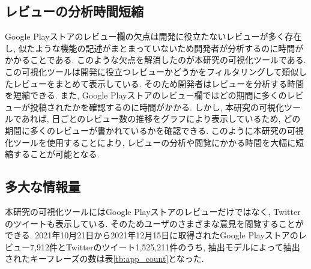 



\subsection{レビューの分析時間短縮}
Google Playストアのレビュー欄の欠点は開発に役立たないレビューが多く存在し, 似たような機能の記述がまとまっていないため開発者が分析するのに時間がかかることである. 
このような欠点を解消したのが本研究の可視化ツールである. この可視化ツールは開発に役立つレビューかどうかをフィルタリングして類似したレビューをまとめて表示している. そのため開発者はレビューを分析する時間を短縮できる. 
また, Google Playストアのレビュー欄ではどの期間に多くのレビューが投稿されたかを確認するのに時間がかかる. しかし, 本研究の可視化ツールであれば, 日ごとのレビュー数の推移をグラフにより表示しているため, どの期間に多くのレビューが書かれているかを確認できる. 
このように本研究の可視化ツールを使用することにより, レビューの分析や閲覧にかかる時間を大幅に短縮することが可能となる. 

\subsection{多大な情報量}
本研究の可視化ツールにはGoogle Playストアのレビューだけではなく, Twitterのツイートも表示している. そのためユーザのさまざまな意見を閲覧することができる. 
2021年10月21日から2021年12月15日に取得されたGoogle Playストアのレビュー7,912件とTwitterのツイート1,525,211件のうち, 抽出モデルによって抽出されたキーフレーズの数は表\ref{tb:app_count}となった. 

